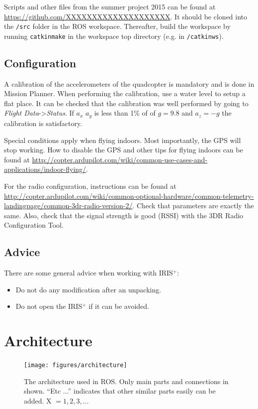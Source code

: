 \documentclass[titlepage,11pt,a4paper]{article}
\begin{document}
Scripts and other files from the summer project 2015 can be found at
\url{https://github.com/XXXXXXXXXXXXXXXXXXXX}. It should be cloned
into the \texttt{/src} folder in the ROS workspace. Thereafter, build
the workspace by running \texttt{catkin\textunderscore make} in the
workspace top directory (e.g. in \texttt{/catkin\textunderscore ws}).


\subsection{Configuration}
A calibration of the accelerometers of the quadcopter is
mandatory and is done in Mission Planner. When performing the
calibration, use a water level to setup
a flat place. It can be checked that the calibration was well
performed by going to \textit{Flight Data}->\textit{Status}. If $a_x$
$a_y$ is less than 1\% of of $g = 9.8$ and $a_z = -g$ the calibration
is satisfactory.

Special conditions apply when flying indoors. Most importantly, the
GPS will stop working. How to disable the GPS and other tips for
flying indoors can be found at \url{http://copter.ardupilot.com/wiki/common-use-cases-and-applications/indoor-flying/}.

For the radio configuration, instructions can be found at
\url{http://copter.ardupilot.com/wiki/common-optional-hardware/common-telemetry-landingpage/common-3dr-radio-version-2/}. Check
that parameters are exactly the same. Also, check that the signal
strength is good (RSSI) with the 3DR Radio Configuration Tool.

\subsection{Advice}
There are some general advice when working with IRIS$^+$:

\begin{itemize}
  \item Do not do any modification after an unpacking.
  \item Do not open the IRIS$^+$ if it can be avoided.
\end{itemize}



\section{Architecture}
\label{sec:architecture}

\begin{figure}[h!]                                                               
  \centering \texttt{[image: figures/architecture]}
  \caption{The architecture used in ROS. Only main parts and
    connections in shown. ``Etc ...'' indicates that other similar
    parts easily can be added. X $= 1, 2, 3, \dots$}
  \label{fig:architecture}                                                              
\end{figure}
\end{document}
